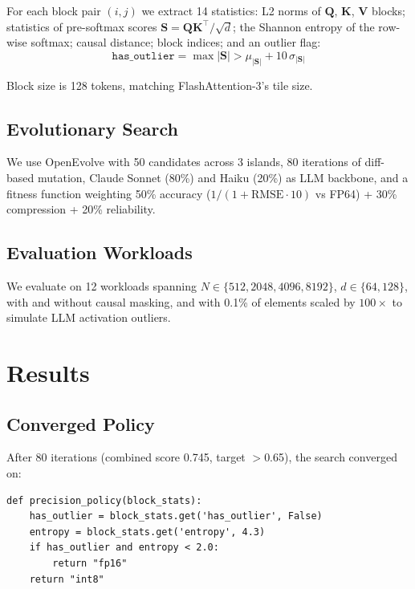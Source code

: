 \documentclass[10pt,twocolumn]{article}
\begin{document}
For each block pair $(i,j)$ we extract 14 statistics: L2 norms of
$\mathbf{Q}$, $\mathbf{K}$, $\mathbf{V}$ blocks; statistics of
pre-softmax scores $\mathbf{S} = \mathbf{Q}\mathbf{K}^\top/\sqrt{d}$;
the Shannon entropy of the row-wise softmax; causal distance; block
indices; and an outlier flag:
\[
\texttt{has\_outlier} = \max|\mathbf{S}| > \mu_{|\mathbf{S}|} + 10\,\sigma_{|\mathbf{S}|}
\]

Block size is 128 tokens, matching FlashAttention-3's tile size.

\subsection{Evolutionary Search}

We use OpenEvolve \citep{openevolve2025} with 50 candidates across 3
islands, 80 iterations of diff-based mutation, Claude Sonnet (80\%) and
Haiku (20\%) as LLM backbone, and a fitness function weighting 50\%
accuracy ($1/(1 + \text{RMSE} \cdot 10)$ vs FP64) + 30\% compression +
20\% reliability.

\subsection{Evaluation Workloads}

We evaluate on 12 workloads spanning $N \in \{512, 2048, 4096, 8192\}$,
$d \in \{64, 128\}$, with and without causal masking, and with 0.1\% of
elements scaled by $100\times$ to simulate LLM activation outliers.

\section{Results}

\subsection{Converged Policy}

After 80 iterations (combined score 0.745, target $>$0.65), the search
converged on:

\begin{lstlisting}[caption={Evolved precision policy (2 of 14 features used).}]
def precision_policy(block_stats):
    has_outlier = block_stats.get('has_outlier', False)
    entropy = block_stats.get('entropy', 4.3)
    if has_outlier and entropy < 2.0:
        return "fp16"
    return "int8"
\end{lstlisting}
\end{document}
